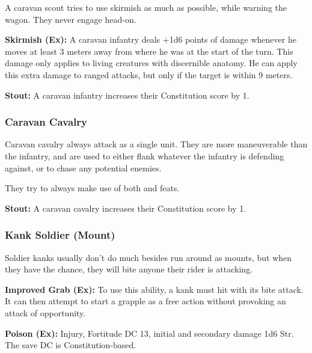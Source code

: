 A caravan scout tries to use skirmish as much as possible, while warning the wagon. They never engage head-on.

\textbf{Skirmish (Ex):} A caravan infantry deals +1d6 points of damage whenever he moves at least 3 meters away from where he was at the start of the turn. This damage only applies to living creatures with discernible anatomy. He can apply this extra damage to ranged attacks, but only if the target is within 9 meters.

\textbf{Stout:} A caravan infantry increases their Constitution score by 1.

\subsubsection{Caravan Cavalry}

Caravan cavalry always attack as a single unit. They are more maneuverable than the infantry, and are used to either flank whatever the infantry is defending against, or to chase any potential enemies.

They try to always make use of both  and  feats.

\textbf{Stout:} A caravan cavalry increases their Constitution score by 1.

\subsubsection{Kank Soldier (Mount)}

Soldier kanks usually don't do much besides run around as mounts, but when they have the chance, they will bite anyone their rider is attacking.

\textbf{Improved Grab (Ex):} To use this ability, a kank must hit with its bite attack. It can then attempt to start a grapple as a free action without provoking an attack of opportunity.

\textbf{Poison (Ex):} Injury, Fortitude DC 13, initial and secondary damage 1d6 Str. The save DC is Constitution-based.



